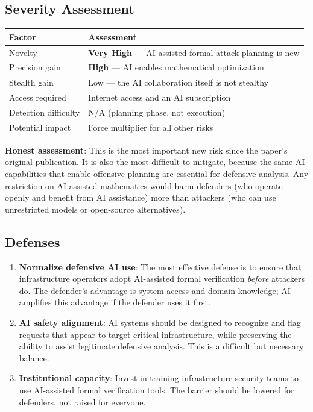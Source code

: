 \documentclass[11pt,a4paper]{article}
\begin{document}
\subsection{Severity Assessment}

\begin{center}
\begin{tabular}{@{}ll@{}}
\toprule
\textbf{Factor} & \textbf{Assessment} \\
\midrule
Novelty & \textbf{Very High} --- AI-assisted formal attack planning is new \\
Precision gain & \textbf{High} --- AI enables mathematical optimization \\
Stealth gain & Low --- the AI collaboration itself is not stealthy \\
Access required & Internet access and an AI subscription \\
Detection difficulty & N/A (planning phase, not execution) \\
Potential impact & Force multiplier for all other risks \\
\bottomrule
\end{tabular}
\end{center}

\textbf{Honest assessment}: This is the most important new risk
since the paper's original publication. It is also the most
difficult to mitigate, because the same AI capabilities that
enable offensive planning are essential for defensive analysis.
Any restriction on AI-assisted mathematics would harm defenders
(who operate openly and benefit from AI assistance) more than
attackers (who can use unrestricted models or open-source
alternatives).

\subsection{Defenses}

\begin{enumerate}
  \item \textbf{Normalize defensive AI use}: The most effective
    defense is to ensure that infrastructure operators adopt
    AI-assisted formal verification \emph{before} attackers do.
    The defender's advantage is system access and domain knowledge;
    AI amplifies this advantage if the defender uses it first.
  \item \textbf{AI safety alignment}: AI systems should be designed
    to recognize and flag requests that appear to target critical
    infrastructure, while preserving the ability to assist
    legitimate defensive analysis. This is a difficult but
    necessary balance.
  \item \textbf{Institutional capacity}: Invest in training
    infrastructure security teams to use AI-assisted formal
    verification tools. The barrier should be lowered for
    defenders, not raised for everyone.
\end{enumerate}
\end{document}
